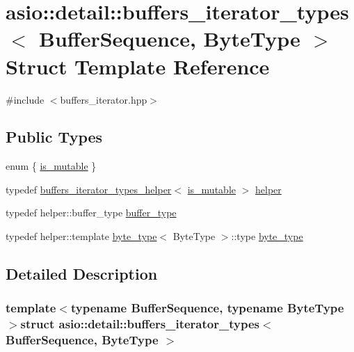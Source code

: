 \hypertarget{structasio_1_1detail_1_1buffers__iterator__types}{}\section{asio\+:\+:detail\+:\+:buffers\+\_\+iterator\+\_\+types$<$ Buffer\+Sequence, Byte\+Type $>$ Struct Template Reference}
\label{structasio_1_1detail_1_1buffers__iterator__types}


{\ttfamily \#include $<$buffers\+\_\+iterator.\+hpp$>$}

\subsection*{Public Types}
\begin{DoxyCompactItemize}
\item 
enum \{ \hyperlink{structasio_1_1detail_1_1buffers__iterator__types_a4dd87513c54e420b5fcb7d32d9b83066acc55882f3dd7c16702dc2dbc6e626583}{is\+\_\+mutable}
 \}
\item 
typedef \hyperlink{structasio_1_1detail_1_1buffers__iterator__types__helper}{buffers\+\_\+iterator\+\_\+types\+\_\+helper}$<$ \hyperlink{structasio_1_1detail_1_1buffers__iterator__types_a4dd87513c54e420b5fcb7d32d9b83066acc55882f3dd7c16702dc2dbc6e626583}{is\+\_\+mutable} $>$ \hyperlink{structasio_1_1detail_1_1buffers__iterator__types_ae6a5428132b9db89770ce9bea21a970b}{helper}
\item 
typedef helper\+::buffer\+\_\+type \hyperlink{structasio_1_1detail_1_1buffers__iterator__types_a7aa8572359d0a382a741a69ca1d46e22}{buffer\+\_\+type}
\item 
typedef helper\+::template \hyperlink{structasio_1_1detail_1_1buffers__iterator__types_a1e923f24ebb373133ae1c54a816fce3e}{byte\+\_\+type}$<$ Byte\+Type $>$\+::type \hyperlink{structasio_1_1detail_1_1buffers__iterator__types_a1e923f24ebb373133ae1c54a816fce3e}{byte\+\_\+type}
\end{DoxyCompactItemize}


\subsection{Detailed Description}
\subsubsection*{template$<$typename Buffer\+Sequence, typename Byte\+Type$>$struct asio\+::detail\+::buffers\+\_\+iterator\+\_\+types$<$ Buffer\+Sequence, Byte\+Type $>$}



